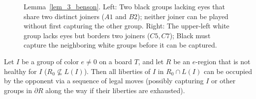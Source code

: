 \begin{figure}[H]
	\centering
	\begin{goban}[7, hoshi = false]
	\end{goban}
	\quad
	\begin{goban}[7, hoshi = false]
	\end{goban}
	\caption{Lemma~\ref{lem_3_benson}. Left: Two black groups lacking eyes that share two distinct \textcolor{bg}{joiners} ($A1$ and $B2$); neither joiner can be played without first capturing the other group. Right: The upper-left white group lacks eyes but borders two \textcolor{bg}{joiners} ($C5, C7$); Black must capture the neighboring white groups before it can be captured.}
	\label{fig:lem_3_benson}
\end{figure}

\begin{lemma}\label{lem_4_benson}
	Let $I$ be a group of color $e \neq 0$ on a board $T$, and let $R$ be an $e$-region that is not healthy for $I$ ($R_0 \not\subseteq L(I)$). Then all liberties of $I$ in $R_0 \cap L(I)$ can be occupied by the opponent via a sequence of legal moves (possibly capturing $I$ or other groups in $\partial R$ along the way if their liberties are exhausted).
\end{lemma}

